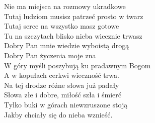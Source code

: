 \begin{text}
Nie ma miejsca na rozmowy ukradkowe\\
Tutaj ludziom musisz patrzeć prosto w twarz\\
Tutaj serce na wszystko masz gotowe\\
Tu na szczytach blisko nieba wiecznie trwasz\\

\vin Dobry Pan mnie wiedzie wyboistą drogą\\
\vin Dobry Pan życzenia moje zna\\
\vin W góry myśli poszybują ku pradawnym Bogom\\
\vin A w kopułach cerkwi wieczność trwa.\\

\vin Na tej drodze różne słowa już padały\\
\vin Słowa złe i dobre, miłość szła i śmierć\\
\vin Tylko buki w górach niewzruszone stoją\\
\vin Jakby chciały się do nieba wznieść.\\
\end{text}
